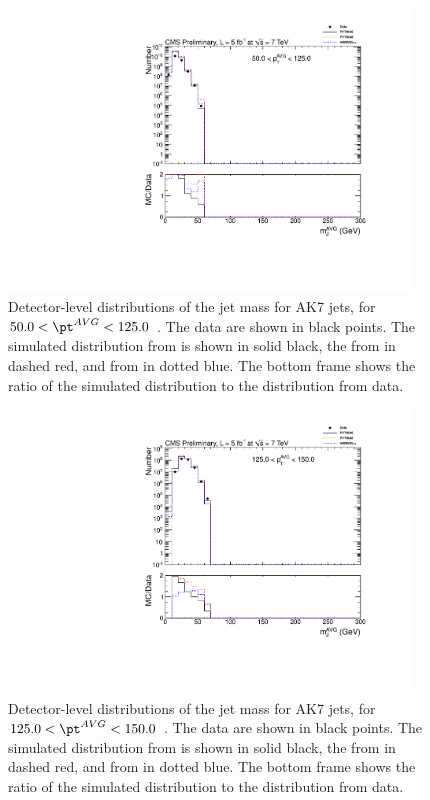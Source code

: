 \clearpage



\begin{figure}[htbp]
\centering
\includegraphics[width=0.95\textwidth]{figs/histAK7MjetVsPtAvg_rawDataMCComparisons_pt_1}
\caption{Detector-level distributions of the jet mass for AK7 jets,
for $50.0 < \pt^{AVG} < 125.0$ \GeVc. The data are shown in black points.
The simulated distribution from \PYTHIA is shown in solid black, 
the from \PYTHIAEIGHT in dashed red, and from \HERWIG in dotted blue. 
The bottom frame shows the ratio of the simulated distribution
to the distribution from data. 
\label{figs:histAK7MjetVsPtAvg_rawDataMCComparisons_pt_1}}
\end{figure}



\begin{figure}[htbp]
\centering
\includegraphics[width=0.95\textwidth]{figs/histAK7MjetVsPtAvg_rawDataMCComparisons_pt_2}
\caption{Detector-level distributions of the jet mass for AK7 jets,
for $125.0 < \pt^{AVG} < 150.0$ \GeVc. The data are shown in black points.
The simulated distribution from \PYTHIA is shown in solid black, 
the from \PYTHIAEIGHT in dashed red, and from \HERWIG in dotted blue. 
The bottom frame shows the ratio of the simulated distribution
to the distribution from data. 
\label{figs:histAK7MjetVsPtAvg_rawDataMCComparisons_pt_2}}
\end{figure}



